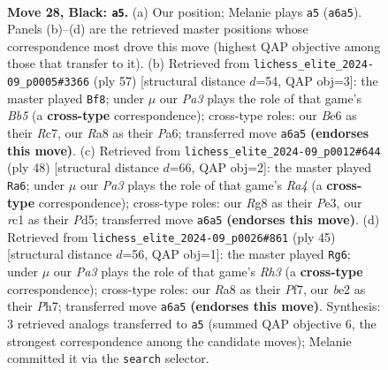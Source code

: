 \documentclass[11pt]{article}
\begin{document}
\clearpage

\begin{figure}[p]\centering
\begin{subfigure}{0.46\textwidth}\centering
\resizebox{\linewidth}{!}{%
\newchessgame
\chessboard[
  setfen={r4kr1/1p3p1p/p3b1p1/3p4/8/3K1PN1/PP2B1PP/2R4R b - - 2 28},
  showmover=false,
  pgfstyle=straightmove, color=movearrow, markmove={a6-a5}
]}
\caption{}
\end{subfigure}\hfill
\begin{subfigure}{0.46\textwidth}\centering
\resizebox{\linewidth}{!}{%
\newchessgame
\chessboard[
  setfen={2r3k1/2r2p1p/p3p1p1/1p4B1/nb6/5N1P/PP3PP1/1R1R2K1 b - - 1 29},
  showmover=false,
  pgfstyle=straightmove, color=movearrow, markmove={b4-f8}
]}
\caption{}
\end{subfigure}
\\[4pt]
\begin{subfigure}{0.46\textwidth}\centering
\resizebox{\linewidth}{!}{%
\newchessgame
\chessboard[
  setfen={1r1r2k1/3n1p1p/5pp1/3P4/R3P3/4PB1P/6P1/R5K1 w - - 1 25},
  showmover=false,
  pgfstyle=straightmove, color=movearrow, markmove={a4-a6}
]}
\caption{}
\end{subfigure}\hfill
\begin{subfigure}{0.46\textwidth}\centering
\resizebox{\linewidth}{!}{%
\newchessgame
\chessboard[
  setfen={r5k1/1b3p1p/2p4r/p2pPR2/Nb6/1P4P1/PBP5/R5K1 b - - 2 23},
  showmover=false,
  pgfstyle=straightmove, color=movearrow, markmove={h6-g6}
]}
\caption{}
\end{subfigure}
\caption{\textbf{Move 28, Black: \texttt{a5}.} (a) Our position; Melanie plays \texttt{a5} (\texttt{a6a5}). Panels (b)--(d) are the retrieved master positions whose correspondence most drove this move (highest QAP objective among those that transfer to it). (b) Retrieved from \texttt{lichess\_elite\_2024-09\_p0005\#3366} (ply 57) [structural distance $d$=54, QAP obj=3]: the master played \texttt{Bf8}; under $\mu$ our \emph{Pa3} plays the role of that game's \emph{Bb5} (a \textbf{cross-type} correspondence); cross-type roles: our \emph{B}e6 as their \emph{R}c7, our \emph{R}a8 as their \emph{P}a6; transferred move \texttt{a6a5} \textbf{(endorses this move)}. (c) Retrieved from \texttt{lichess\_elite\_2024-09\_p0012\#644} (ply 48) [structural distance $d$=66, QAP obj=2]: the master played \texttt{Ra6}; under $\mu$ our \emph{Pa3} plays the role of that game's \emph{Ra4} (a \textbf{cross-type} correspondence); cross-type roles: our \emph{R}g8 as their \emph{P}e3, our \emph{r}c1 as their \emph{P}d5; transferred move \texttt{a6a5} \textbf{(endorses this move)}. (d) Retrieved from \texttt{lichess\_elite\_2024-09\_p0026\#861} (ply 45) [structural distance $d$=56, QAP obj=1]: the master played \texttt{Rg6}; under $\mu$ our \emph{Pa3} plays the role of that game's \emph{Rh3} (a \textbf{cross-type} correspondence); cross-type roles: our \emph{R}a8 as their \emph{P}f7, our \emph{b}e2 as their \emph{P}h7; transferred move \texttt{a6a5} \textbf{(endorses this move)}. Synthesis: 3 retrieved analogs transferred to \texttt{a5} (summed QAP objective 6, the strongest correspondence among the candidate moves); Melanie committed it via the \texttt{search} selector.}
\label{fig:thought-m55}
\end{figure}
\end{document}
